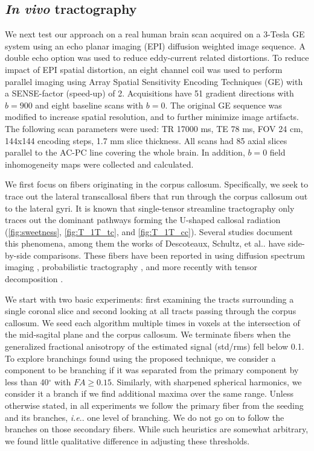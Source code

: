\documentclass[final,hyperref]{gatech-thesis}
\makeatletter
\renewcommand{\deg}{\ensuremath{^\circ}\xspace}
\DeclareRobustCommand\onedot{\futurelet\@let@token\@onedot}
\def\@onedot{\ifx\@let@token.\else.\null\fi\xspace}
\newcommand{\ie}{\textit{i.e}\onedot}
\newcommand{\etal}{et al\onedot}
\newcommand{\bn}[1]{\ensuremath{b\!=\!#1}\xspace}
\newcommand{\Invivo}{\textit{In vivo}\xspace}
\makeatother
\begin{document}
\subsection{\Invivo tractography}  \label{sec:2T_real}

We next test our approach on a real human brain scan acquired on a 3-Tesla GE
system using an echo planar imaging (EPI) diffusion weighted image sequence.
A double echo option was used to reduce eddy-current related distortions.  To
reduce impact of EPI spatial distortion, an eight channel coil was used to
perform parallel imaging using Array Spatial Sensitivity Encoding Techniques
(GE) with a SENSE-factor (speed-up) of 2.  Acquisitions have 51 gradient
directions with \bn{900} and eight baseline scans with \bn{0}.  The original
GE sequence was modified to increase spatial resolution, and to further
minimize image artifacts.  The following scan parameters were used: TR 17000
ms, TE 78 ms, FOV 24 cm, 144x144 encoding steps, 1.7 mm slice thickness. All
scans had 85 axial slices parallel to the AC-PC line covering the whole brain.
In addition, \bn{0} field inhomogeneity maps were collected and calculated.

We first focus on fibers originating in the corpus callosum.  Specifically, we
seek to trace out the lateral transcallosal fibers that run through the corpus
callosum out to the lateral gyri.  It is known that single-tensor streamline
tractography only traces out the dominant pathways forming the U-shaped
callosal radiation (\autoref{fig:sweetness}, \ref{fig:T_1T_tc}, and
\ref{fig:T_1T_cc}).  Several studies document this phenomena, among them the
works of Descoteaux, Schultz, \etal \cite{Descoteaux2009tmi,Schultz2008} have
side-by-side comparisons.  These fibers have been reported in using diffusion
spectrum imaging \cite{Hagmann2004}, probabilistic tractography
\cite{Kaden2007,Anwander2007,Descoteaux2009tmi}, and more recently with tensor
decomposition \cite{Schultz2008}.

We start with two basic experiments:  first examining the tracts surrounding a
single coronal slice and second looking at all tracts passing through the
corpus callosum.  We seed each algorithm multiple times in voxels at the
intersection of the mid-sagital plane and the corpus callosum.  We terminate
fibers when the generalized fractional anisotropy of the estimated signal
(std/rms) fell below 0.1.  To explore branchings found using the proposed
technique, we consider a component to be branching if it was separated from
the primary component by less than 40\deg with $FA\ge0.15$.  Similarly, with
sharpened spherical harmonics, we consider it a branch if we find additional
maxima over the same range.  Unless otherwise stated, in all experiments we
follow the primary fiber from the seeding and its branches, \ie one level of
branching.  We do not go on to follow the branches on those secondary fibers.
While such heuristics are somewhat arbitrary, we found little qualitative
difference in adjusting these thresholds.
\end{document}
